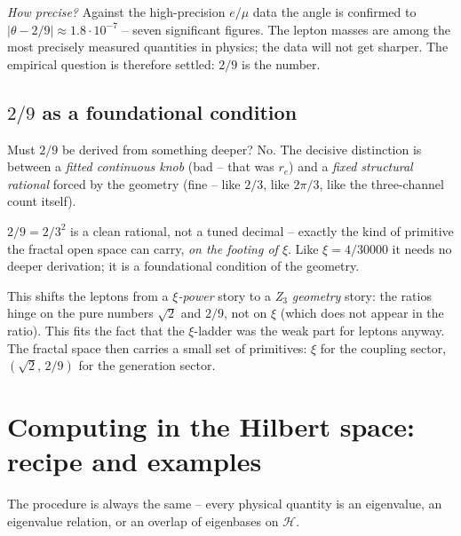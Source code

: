 \emph{How precise?} Against the high-precision $e/\mu$ data the angle is
confirmed to $|\theta-2/9|\approx1.8\cdot10^{-7}$ -- seven significant figures.
The lepton masses are among the most precisely measured quantities in physics;
the data will not get sharper. The empirical question is therefore settled:
$2/9$ is the number.

\subsection{$2/9$ as a foundational condition}

Must $2/9$ be derived from something deeper? No. The decisive distinction is
between a \emph{fitted continuous knob} (bad -- that was $r_e$) and a
\emph{fixed structural rational} forced by the geometry (fine -- like $2/3$,
like $2\pi/3$, like the three-channel count itself).

\begin{foundation}
$2/9=2/3^2$ is a clean rational, not a tuned decimal -- exactly the kind of
primitive the fractal open space can carry, \emph{on the footing of $\xi$}.
Like $\xi=4/30000$ it needs no deeper derivation; it is a foundational
condition of the geometry.
\end{foundation}

This shifts the leptons from a \emph{$\xi$-power} story to a \emph{Z$_3$
geometry} story: the ratios hinge on the pure numbers $\sqrt2$ and $2/9$, not on
$\xi$ (which does not appear in the ratio). This fits the fact that the
$\xi$-ladder was the weak part for leptons anyway. The fractal space then
carries a small set of primitives: $\xi$ for the coupling sector,
$(\sqrt2,\,2/9)$ for the generation sector.

\section{Computing in the Hilbert space: recipe and examples}

The procedure is always the same -- every physical quantity is an eigenvalue,
an eigenvalue relation, or an overlap of eigenbases on $\mathcal{H}$.

